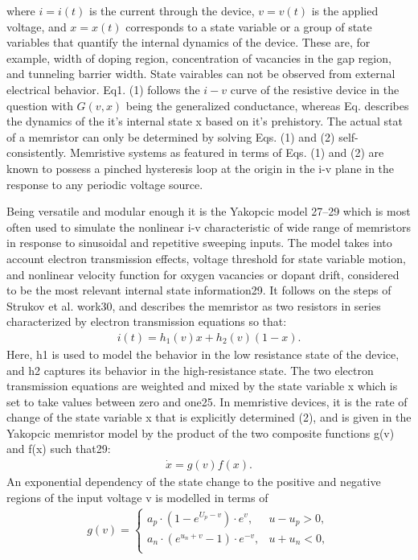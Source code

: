 \documentclass{article}
\begin{document}
{\begin{multicols}{2}
where $i = i(t)$ is the current through the device, $v = v(t)$
is the applied voltage, and $x = x(t)$ corresponds to a state
variable or a group of state variables that quantify the
internal dynamics of the device. These are, for example,
width of doping region, concentration of vacancies in the gap region, and tunneling barrier width. State vairables can not be observed from external electrical behavior. Eq1. (1) follows the $i-v$ curve of the resistive device in the question with $G(v,x)$ being the generalized conductance, whereas Eq. describes the dynamics of the it's internal state x based on it's prehistory. The actual stat of a memristor can only be determined by solving Eqs. (1) and (2) self-consistently. Memristive systems as featured
in terms of Eqs. (1) and (2) are known to possess a pinched hysteresis loop at the origin in the i-v plane in the response to any periodic voltage source. \par
Being versatile and modular enough it is the Yakopcic model 27–29 which is most often used to simulate
the nonlinear i-v characteristic of wide range of memristors in response to sinusoidal and repetitive sweeping
inputs. The model takes into account electron transmission effects, voltage threshold for state variable motion,
and nonlinear velocity function for oxygen vacancies or
dopant drift, considered to be the most relevant internal
state information29. It follows on the steps of Strukov et
al. work30, and describes the memristor as two resistors
in series characterized by electron transmission equations
so that:
\begin{align}
     i(t) = h_1 (v)x + h_2 (v)(1-x) .
\end{align}
Here, h1 is used to model the behavior in the low resistance state of the device, and h2 captures its behavior in the high-resistance state.
The two electron transmission equations are weighted and mixed by the state
variable x which is set to take values between zero and
one25. In memristive devices, it is the rate of change of
the state variable x that is explicitly determined (2), and
is given in the Yakopcic memristor model by the product
of the two composite functions g(v) and f(x) such that29:
\begin{align}
     \dot{x} = g(v)f(x).
\end{align}
An exponential dependency of the state change to the
positive and negative regions of the input voltage v is
modelled in terms of
\begin{align}{}
     g(v) = \begin{cases} a_p \cdot (1-e^{U_p -v}) \cdot e^v, &u-u_p > 0, \\ a_n \cdot (e^{u_n +v}-1)\cdot e^{-v}, &u+u_n < 0, \\

\end{cases}
\end{align}
\end{multicols}}
\end{document}
